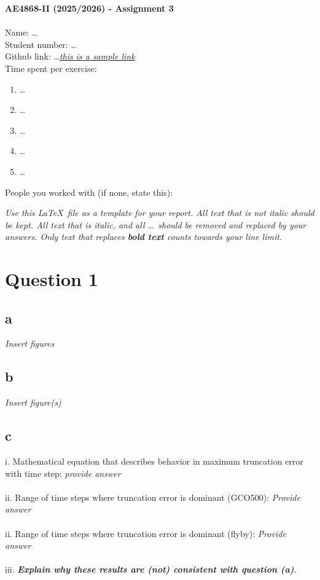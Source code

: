 \documentclass{report}
\begin{document}
\Large
\textbf{AE4868-II (2025/2026) - Assignment 3} \\
\normalsize \\

Name: \ldots \\

Student number: \ldots \\

Github link: \ldots \textit{\href{https://github.com/my_github_username/my_private_repo}{this is a sample link}} \\

Time spent per exercise:
\begin{enumerate}
    \item \ldots
    \item \ldots
    \item \ldots
    \item \ldots
        \item \ldots

\end{enumerate} 

People you worked with (if none, state this):

\clearpage

\noindent\textit{Use this \LaTeX~file as a template for your report. All text that is not italic should be kept. All text that is italic, and all \ldots~should be removed and replaced by your answers. Only text that replaces \textbf{bold text} counts towards your line limit.}

\section*{Question 1}

\subsection*{a}
\textit{Insert figures}
\subsection*{b}
\textit{Insert figure(s)}
\subsection*{c}
i. Mathematical equation that describes behavior in maximum truncation error with time step: \textit{provide answer}\\
\\
ii. Range of time steps where truncation error is dominant (GCO500): {\textit{Provide answer}}\\
\\
ii. Range of time steps where truncation error is dominant (flyby): {\textit{Provide answer}}\\
\\
iii. \textbf{\textit{Explain why these results are (not) consistent with question (a)}}.
\\
\clearpage
\end{document}
